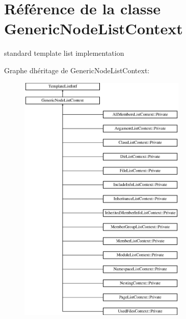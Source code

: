 \hypertarget{class_generic_node_list_context}{}\section{Référence de la classe Generic\+Node\+List\+Context}
\label{class_generic_node_list_context}


standard template list implementation  


Graphe d\textquotesingle{}héritage de Generic\+Node\+List\+Context\+:\begin{figure}[H]
\begin{center}
\leavevmode
\includegraphics[height=12.000000cm]{class_generic_node_list_context}
\end{center}
\end{figure}
